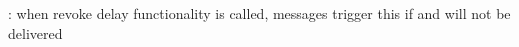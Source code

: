 
\begin{DoxyRefList}
\item[Global \mbox{\hyperlink{message_8c_af0eb4f46db2a45d736b02c2ac731fdba}{read\+Message}} (msg\+\_\+t $\ast$dest\+\_\+buffer, msg\+\_\+manager\+\_\+t $\ast$manager)]\label{bug__bug000001}%
%
\+: when \textquotesingle{}revoke delay\textquotesingle{} functionality is called, messages trigger this if and will not be delivered 
\end{DoxyRefList}